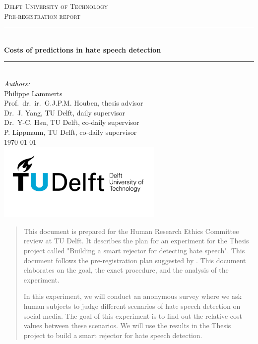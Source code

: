 \documentclass[a4paper]{article}
\begin{document}
\begin{titlepage}

    \newcommand{\HRule}{\rule{\linewidth}{0.5mm}} 							%
    \center

    \textsc{\LARGE Delft University of Technology}\\[1cm]

    \textsc{\Large Pre-registration report}\\[0.2cm]
    \HRule \\[0.8cm]
    { \huge \bfseries Costs of predictions in hate speech detection}\\[0.7cm]								%
    \HRule \\[2cm]
    \large
    \emph{Authors:}\\
    Philippe Lammerts\\
    Prof.\ dr.\ ir.\ G.J.P.M. Houben, thesis advisor \\
    Dr.\ J. Yang, TU Delft, daily supervisor \\
    Dr.\ Y-C. Hsu, TU Delft, co-daily supervisor\\
    P. Lippmann, TU Delft, co-daily supervisor\\

    {\large \today}\\[5cm]
    \includegraphics[width=0.6\textwidth]{images/TU_delft_logo.jpg}\\[1cm] 	%
    \vfill
\end{titlepage}

\begin{abstract}
    This document is prepared for the Human Research Ethics Committee review at TU Delft. It describes the plan for an experiment for the Thesis project called "Building a smart rejector for detecting hate speech". This document follows the pre-registration plan suggested by \cite{van2016pre}. This document elaborates on the goal, the exact procedure, and the analysis of the experiment.

    In this experiment, we will conduct an anonymous survey where we ask human subjects to judge different scenarios of hate speech detection on social media. The goal of this experiment is to find out the relative cost values between these scenarios. We will use the results in the Thesis project to build a smart rejector for hate speech detection.
\end{abstract}
\end{document}
